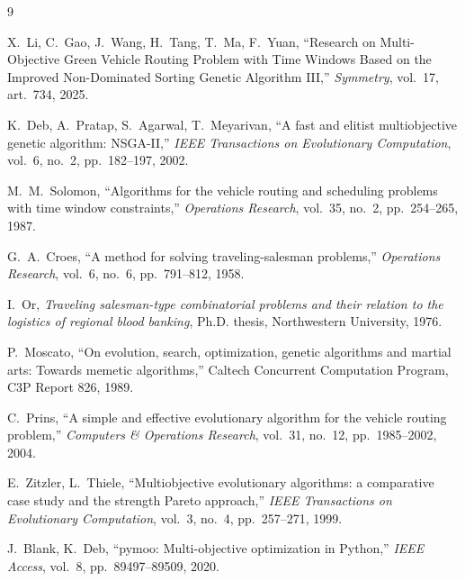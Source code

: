 \begin{thebibliography}{9}
\setlength{\itemsep}{2pt}

X.~Li, C.~Gao, J.~Wang, H.~Tang, T.~Ma, F.~Yuan,
``Research on Multi-Objective Green Vehicle Routing Problem with Time Windows Based on the Improved
Non-Dominated Sorting Genetic Algorithm III,'' \emph{Symmetry}, vol.~17, art.~734, 2025.

K.~Deb, A.~Pratap, S.~Agarwal, T.~Meyarivan,
``A fast and elitist multiobjective genetic algorithm: NSGA-II,''
\emph{IEEE Transactions on Evolutionary Computation}, vol.~6, no.~2, pp.~182--197, 2002.

M.~M.~Solomon,
``Algorithms for the vehicle routing and scheduling problems with time window constraints,''
\emph{Operations Research}, vol.~35, no.~2, pp.~254--265, 1987.

G.~A.~Croes,
``A method for solving traveling-salesman problems,''
\emph{Operations Research}, vol.~6, no.~6, pp.~791--812, 1958.

I.~Or,
\emph{Traveling salesman-type combinatorial problems and their relation to the logistics of regional
blood banking}, Ph.D. thesis, Northwestern University, 1976.

P.~Moscato,
``On evolution, search, optimization, genetic algorithms and martial arts: Towards memetic
algorithms,'' Caltech Concurrent Computation Program, C3P Report 826, 1989.

C.~Prins,
``A simple and effective evolutionary algorithm for the vehicle routing problem,''
\emph{Computers \& Operations Research}, vol.~31, no.~12, pp.~1985--2002, 2004.

E.~Zitzler, L.~Thiele,
``Multiobjective evolutionary algorithms: a comparative case study and the strength Pareto
approach,'' \emph{IEEE Transactions on Evolutionary Computation}, vol.~3, no.~4, pp.~257--271, 1999.

J.~Blank, K.~Deb,
``pymoo: Multi-objective optimization in Python,'' \emph{IEEE Access}, vol.~8, pp.~89497--89509, 2020.

\end{thebibliography}
